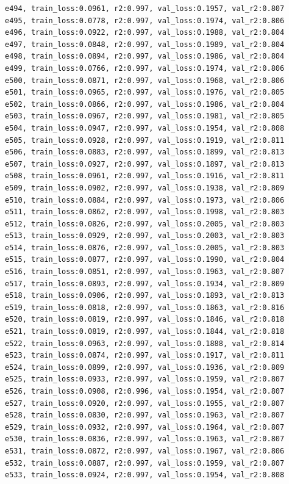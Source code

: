 \documentclass[a4paper, 12pt]{article}
\begin{document}
\begin{lstlisting}
e494, train_loss:0.0961, r2:0.997, val_loss:0.1957, val_r2:0.807
e495, train_loss:0.0778, r2:0.997, val_loss:0.1974, val_r2:0.806
e496, train_loss:0.0922, r2:0.997, val_loss:0.1988, val_r2:0.804
e497, train_loss:0.0848, r2:0.997, val_loss:0.1989, val_r2:0.804
e498, train_loss:0.0894, r2:0.997, val_loss:0.1986, val_r2:0.804
e499, train_loss:0.0766, r2:0.997, val_loss:0.1974, val_r2:0.806
e500, train_loss:0.0871, r2:0.997, val_loss:0.1968, val_r2:0.806
e501, train_loss:0.0965, r2:0.997, val_loss:0.1976, val_r2:0.805
e502, train_loss:0.0866, r2:0.997, val_loss:0.1986, val_r2:0.804
e503, train_loss:0.0967, r2:0.997, val_loss:0.1981, val_r2:0.805
e504, train_loss:0.0947, r2:0.997, val_loss:0.1954, val_r2:0.808
e505, train_loss:0.0928, r2:0.997, val_loss:0.1919, val_r2:0.811
e506, train_loss:0.0883, r2:0.997, val_loss:0.1899, val_r2:0.813
e507, train_loss:0.0927, r2:0.997, val_loss:0.1897, val_r2:0.813
e508, train_loss:0.0961, r2:0.997, val_loss:0.1916, val_r2:0.811
e509, train_loss:0.0902, r2:0.997, val_loss:0.1938, val_r2:0.809
e510, train_loss:0.0884, r2:0.997, val_loss:0.1973, val_r2:0.806
e511, train_loss:0.0862, r2:0.997, val_loss:0.1998, val_r2:0.803
e512, train_loss:0.0826, r2:0.997, val_loss:0.2005, val_r2:0.803
e513, train_loss:0.0929, r2:0.997, val_loss:0.2003, val_r2:0.803
e514, train_loss:0.0876, r2:0.997, val_loss:0.2005, val_r2:0.803
e515, train_loss:0.0877, r2:0.997, val_loss:0.1990, val_r2:0.804
e516, train_loss:0.0851, r2:0.997, val_loss:0.1963, val_r2:0.807
e517, train_loss:0.0893, r2:0.997, val_loss:0.1934, val_r2:0.809
e518, train_loss:0.0906, r2:0.997, val_loss:0.1893, val_r2:0.813
e519, train_loss:0.0818, r2:0.997, val_loss:0.1863, val_r2:0.816
e520, train_loss:0.0819, r2:0.997, val_loss:0.1846, val_r2:0.818
e521, train_loss:0.0819, r2:0.997, val_loss:0.1844, val_r2:0.818
e522, train_loss:0.0963, r2:0.997, val_loss:0.1888, val_r2:0.814
e523, train_loss:0.0874, r2:0.997, val_loss:0.1917, val_r2:0.811
e524, train_loss:0.0899, r2:0.997, val_loss:0.1936, val_r2:0.809
e525, train_loss:0.0933, r2:0.997, val_loss:0.1959, val_r2:0.807
e526, train_loss:0.0908, r2:0.996, val_loss:0.1954, val_r2:0.807
e527, train_loss:0.0920, r2:0.997, val_loss:0.1955, val_r2:0.807
e528, train_loss:0.0830, r2:0.997, val_loss:0.1963, val_r2:0.807
e529, train_loss:0.0932, r2:0.997, val_loss:0.1964, val_r2:0.807
e530, train_loss:0.0836, r2:0.997, val_loss:0.1963, val_r2:0.807
e531, train_loss:0.0872, r2:0.997, val_loss:0.1967, val_r2:0.806
e532, train_loss:0.0887, r2:0.997, val_loss:0.1959, val_r2:0.807
e533, train_loss:0.0924, r2:0.997, val_loss:0.1954, val_r2:0.808

\end{lstlisting}
\end{document}
